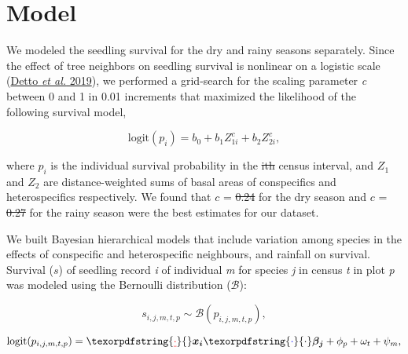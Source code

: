 \documentclass[
  12pt,
  letterpaper,
  DIV=11,
  numbers=noendperiod]{scrartcl}
\author{}
\date{}
\providecommand{\DIFaddtex}[1]{{\protect\color{blue}\uwave{#1}}} %
\providecommand{\DIFdeltex}[1]{{\protect\color{red}\sout{#1}}}                      %
\providecommand{\DIFaddbegin}{} %
\providecommand{\DIFaddend}{} %
\providecommand{\DIFdelbegin}{} %
\providecommand{\DIFdelend}{} %
\providecommand{\DIFadd}[1]{\texorpdfstring{\DIFaddtex{#1}}{#1}} %
\providecommand{\DIFdel}[1]{\texorpdfstring{\DIFdeltex{#1}}{}} %
\newcommand{\DIFscaledelfig}{0.5}
\newlength{\DIFdelgraphicswidth} %
\newlength{\DIFdelgraphicsheight} %
\newcommand{\DIFaddincludegraphics}[2][]{{\color{blue}\fbox{\DIFOincludegraphics[#1]{#2}}}} %
\newcommand{\DIFdelincludegraphics}[2][]{%
\sbox{\DIFdelgraphicsbox}{\DIFOincludegraphics[#1]{#2}}%
\settoboxwidth{\DIFdelgraphicswidth}{\DIFdelgraphicsbox} %
\settoboxtotalheight{\DIFdelgraphicsheight}{\DIFdelgraphicsbox} %
\scalebox{\DIFscaledelfig}{%
\parbox[b]{\DIFdelgraphicswidth}{\usebox{\DIFdelgraphicsbox}\\[-\baselineskip] \rule{\DIFdelgraphicswidth}{0em}}\llap{\resizebox{\DIFdelgraphicswidth}{\DIFdelgraphicsheight}{%
\setlength{\unitlength}{\DIFdelgraphicswidth}%
\begin{picture}(1,1)%
\thicklines\linethickness{2pt} %
{\color[rgb]{1,0,0}\put(0,0){\framebox(1,1){}}}%
{\color[rgb]{1,0,0}\put(0,0){\line( 1,1){1}}}%
{\color[rgb]{1,0,0}\put(0,1){\line(1,-1){1}}}%
\end{picture}%
}\hspace*{3pt}}} %
} %
\DeclareRobustCommand{\DIFaddbegin}{\DIFOaddbegin \let\includegraphics\DIFaddincludegraphics} %
\DeclareRobustCommand{\DIFaddend}{\DIFOaddend \let\includegraphics\DIFOincludegraphics} %
\DeclareRobustCommand{\DIFdelbegin}{\DIFOdelbegin \let\includegraphics\DIFdelincludegraphics} %
\DeclareRobustCommand{\DIFdelend}{\DIFOaddend \let\includegraphics\DIFOincludegraphics} %
\begin{document}
\ifdefined\Shaded\DIFdelbegin %
\DIFdelend \DIFaddbegin \renewenvironment{Shaded}{\begin{tcolorbox}[breakable, borderline west={3pt}{0pt}{shadecolor}, enhanced, sharp corners, interior hidden, boxrule=0pt, frame hidden]}{\end{tcolorbox}}\DIFaddend \fi

\hypertarget{model}{%
\section{Model}\label{model}}

We modeled the seedling survival for the dry and rainy seasons
separately. Since the effect of tree neighbors on seedling survival is
nonlinear on a logistic scale (\protect\hyperlink{ref-Detto2019}{Detto
\emph{et al.} 2019}), we performed a grid-search for the scaling
parameter \emph{c} between 0 and 1 in 0.01 increments that maximized the
likelihood of the following survival model,

\[
\mathrm{logit}(p_i) = b_0 + b_1 Z_{1i}^c + b_2 Z_{2i}^c,
\]

where \(p_i\) is the individual survival probability in the \DIFdelbegin \DIFdel{ith }\DIFdelend \DIFaddbegin \emph{\DIFadd{i}}\DIFadd{th
}\DIFaddend census interval, and \(Z_1\) and \(Z_2\) are distance-weighted sums of
basal areas of conspecifics and heterospecifics respectively. We found
that \(c\) = \DIFdelbegin \DIFdel{0.24 }\DIFdelend \DIFaddbegin \DIFadd{0.27 }\DIFaddend for the dry season and \(c\) = \DIFdelbegin \DIFdel{0.27 }\DIFdelend \DIFaddbegin \DIFadd{0.24 }\DIFaddend for the rainy
season were the best estimates for our dataset.

We built Bayesian hierarchical models that include variation among
species in the effects of conspecific and heterospecific neighbours, and
rainfall on survival. Survival (\(s\)) of seedling record \emph{i} of
individual \emph{m} for species \emph{j} in census \emph{t} in plot
\emph{p} was modeled using the Bernoulli distribution (\(\mathcal{B}\)):

\[
s_{i,j,m,t,p} \sim \mathcal{B}(p_{i, j, m, t, p}),
\]

\[
\mathrm{logit}(p_{i,j,m,t,p}) = \DIFdelbegin %
\DIFdel{\cdot }\DIFdelend \boldsymbol{x_{i}} \DIFaddbegin \DIFadd{\cdot }\boldsymbol{\beta_{j}} \DIFaddend + \phi_p + \omega_t + \psi_m,
\]
\end{document}
